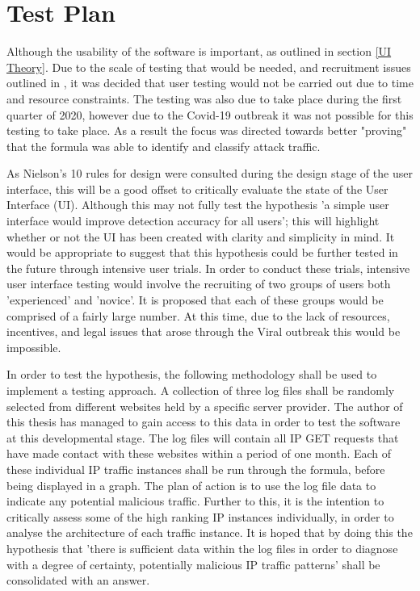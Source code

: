 \section{Test Plan}

Although the usability of the software is important, as outlined in section \ref{UI Theory}. Due to the scale of testing that would be needed, and recruitment issues outlined in \cite{ben2015effects}, it was decided that user testing would not be carried out due to time and resource constraints. The testing was also due to take place during the first quarter of 2020, however due to the Covid-19 outbreak it was not possible for this testing to take place. As a result the focus was directed towards better "proving" that the formula was able to identify and classify attack traffic. 


As Nielson's 10 rules for design were consulted during the design stage of the user interface, this will be a good offset to critically evaluate the state of the User Interface (UI). Although this may not fully test the hypothesis 'a simple user interface would improve detection accuracy for all users'; this will highlight whether or not the UI has been created with clarity and simplicity in mind. It would be appropriate to suggest that this hypothesis could be further tested in the future through intensive user trials. In order to conduct these trials, intensive user interface testing would involve the recruiting of two groups of users both 'experienced' and 'novice'. It is proposed that each of these groups would be comprised of a fairly large number. At this time, due to the lack of resources, incentives, and legal issues that arose through the Viral outbreak this would be impossible.

In order to test the hypothesis, the following methodology shall be used to implement a testing approach. A collection of three log files shall be randomly selected from different websites held by a specific server provider. The author of this thesis has managed to gain access to this data in order to test the software at this developmental stage. The log files will contain all IP GET requests that have made contact with these websites within a period of one month. Each of these individual IP traffic instances shall be run through the formula, before being displayed in a graph. The plan of action is to use the log file data to indicate any potential malicious traffic. Further to this, it is the intention to critically assess some of the high ranking IP instances individually, in order to analyse the architecture of each traffic instance. It is hoped that by doing this the hypothesis that 'there is sufficient data within the log files in order to diagnose with a degree of certainty, potentially malicious IP traffic patterns' shall be consolidated with an answer. 


